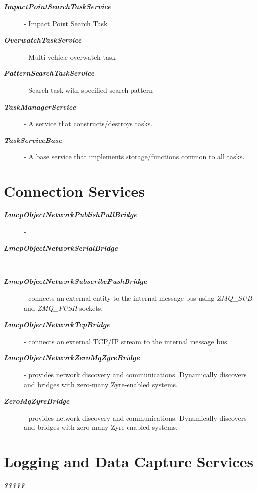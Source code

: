 \begin{description}
	\item[\textbf{\textit{ImpactPointSearchTaskService}}] - Impact Point Search Task 
	\item[\textbf{\textit{OverwatchTaskService}}] - Multi vehicle overwatch task 
	\item[\textbf{\textit{PatternSearchTaskService}}] - Search task with specified search pattern 
	\item[\textbf{\textit{TaskManagerService}}] - A service that constructs/destroys tasks.
	\item[\textbf{\textit{TaskServiceBase}}] - A base service that implements storage/functions common to all tasks.
	
\end{description}


\section{Connection Services}
\begin{description}
	\item[\textbf{\textit{LmcpObjectNetworkPublishPullBridge}}] -    
	\item[\textbf{\textit{LmcpObjectNetworkSerialBridge}}] - 
	\item[\textbf{\textit{LmcpObjectNetworkSubscribePushBridge}}] - connects an external entity to the internal message bus using \textit{ZMQ\_SUB} and \textit{ZMQ\_PUSH} sockets.
	\item[\textbf{\textit{LmcpObjectNetworkTcpBridge}}] - connects an external TCP/IP stream to the internal message bus.
	\item[\textbf{\textit{LmcpObjectNetworkZeroMqZyreBridge}}] - provides network discovery and communications. Dynamically discovers and bridges with zero-many Zyre-enabled systems. 
	\item[\textbf{\textit{ZeroMqZyreBridge}}] - provides network discovery and communications. Dynamically discovers and bridges with zero-many Zyre-enabled systems.
\end{description}

\section{Logging and Data Capture Services}
\begin{description}
	\item[\textbf{\textit{?????}}]    
\end{description}




